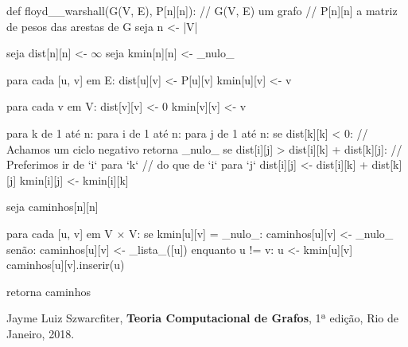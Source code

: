 \documentclass{homework}
\begin{document}
	\begin{algor}
	def floyd__warshall(G(V, E), P[n][n]):
		// G(V, E) um grafo
		// P[n][n] a matriz de pesos das arestas de G
		seja n <- |V|
		
		seja dist[n][n] <- $\infty$
		seja kmin[n][n] <- _nulo_
		
		para cada [u, v] em E:
			dist[u][v] <- P[u][v] 
			kmin[u][v] <- v
			
		para cada v em V:
			dist[v][v] <- 0
			kmin[v][v] <- v
			
		para k de 1 até n:
			para i de 1 até n:
				para j de 1 até n:
					se dist[k][k] < 0:
						// Achamos um ciclo negativo
						retorna _nulo_
					se dist[i][j] > dist[i][k] + dist[k][j]:
						// Preferimos ir de `i` para `k`
						// do que de `i` para `j`
						dist[i][j] <- dist[i][k] + dist[k][j]
						kmin[i][j] <- kmin[i][k]
						
		seja caminhos[n][n]
		
		para cada [u, v] em V $\times$ V:
			se kmin[u][v] = _nulo_:
				caminhos[u][v] <- _nulo_
			senão:
				caminhos[u][v] <- _lista_([u])
				enquanto u != v:
					u <- kmin[u][v]
					caminhos[u][v].inserir(u)
		
		retorna caminhos
	\end{algor}
	
	\quest %
	
	\subquest %
	
	\subquest %
	
	\quest %
	
	\quest %
	
	
	
	\begin{thebibliography}{10}
		 Jayme Luiz Szwarcfiter, \textbf{Teoria Computacional de Grafos}, 1ª edição, Rio de Janeiro, 2018.
	\end{thebibliography}
\end{document}
